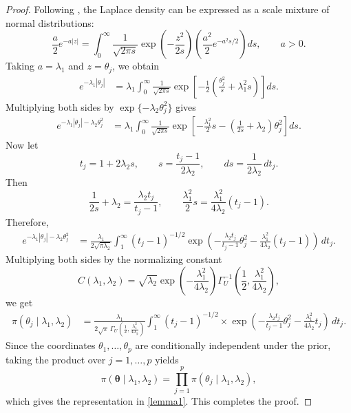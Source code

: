 \documentclass[preprint,12pt,authoryear]{elsarticle}
\def\th{\boldsymbol{\theta}}
\begin{document}
\begin{proof}
Following \cite{andrews1974scale}, the Laplace density can be expressed as a
scale mixture of normal distributions:
\begin{equation}\label{laplace_andrew}
\frac{a}{2}e^{-a|z|}
=
\int_0^\infty
\frac{1}{\sqrt{2\pi s}}
\exp\!\left(-\frac{z^2}{2s}\right)
\left(
\frac{a^2}{2}e^{-a^2s/2}
\right)ds,
\qquad a>0.
\end{equation}
Taking \(a=\lambda_1\) and \(z=\theta_j\), we obtain
\begin{align}
e^{-\lambda_1|\theta_j|}
&=
\lambda_1
\int_0^\infty
\frac{1}{\sqrt{2\pi s}}
\exp\!\left[
-\frac12
\left(
\frac{\theta_j^2}{s}
+
\lambda_1^2s
\right)
\right]ds .
\end{align}
Multiplying both sides by \(\exp\{-\lambda_2\theta_j^2\}\) gives
\begin{align}
e^{-\lambda_1|\theta_j|-\lambda_2\theta_j^2}
&=
\lambda_1
\int_0^\infty
\frac{1}{\sqrt{2\pi s}}
\exp\!\left[
-\frac{\lambda_1^2}{2}s
-
\left(
\frac{1}{2s}
+
\lambda_2
\right)\theta_j^2
\right]ds .
\end{align}
Now let
\[
t_j=1+2\lambda_2s,
\qquad
s=\frac{t_j-1}{2\lambda_2},
\qquad
ds=\frac{1}{2\lambda_2}\,dt_j .
\]
Then
\[
\frac{1}{2s}+\lambda_2
=
\frac{\lambda_2t_j}{t_j-1},
\qquad
\frac{\lambda_1^2}{2}s
=
\frac{\lambda_1^2}{4\lambda_2}(t_j-1).
\]
Therefore,
\begin{align}
e^{-\lambda_1|\theta_j|-\lambda_2\theta_j^2}
&=
\frac{\lambda_1}{2\sqrt{\pi\lambda_2}}
\int_1^\infty
(t_j-1)^{-1/2}
\exp\!\left(
-\frac{\lambda_2t_j}{t_j-1}\theta_j^2
-\frac{\lambda_1^2}{4\lambda_2}(t_j-1)
\right)\,dt_j .
\end{align}
Multiplying both sides by the normalizing constant
\[
C(\lambda_1,\lambda_2)
=
\sqrt{\lambda_2}
\exp\!\left(
-\frac{\lambda_1^2}{4\lambda_2}
\right)
\Gamma_U^{-1}
\left(
\frac12,
\frac{\lambda_1^2}{4\lambda_2}
\right),
\]
we get
\begin{align}
\pi(\theta_j\mid \lambda_1,\lambda_2)
&=
\frac{\lambda_1}
{2\sqrt{\pi}\,
\Gamma_U\left(\frac12,\frac{\lambda_1^2}{4\lambda_2}\right)}
\int_1^\infty
(t_j-1)^{-1/2} \times
\exp\!\left(
-\frac{\lambda_2t_j}{t_j-1}\theta_j^2
-\frac{\lambda_1^2}{4\lambda_2}t_j
\right)\,dt_j .
\end{align}
Since the coordinates \(\theta_1,\dots,\theta_p\) are conditionally independent
under the prior, taking the product over \(j=1,\dots,p\) yields
\[
\pi(\th\mid \lambda_1,\lambda_2)
=
\prod_{j=1}^p
\pi(\theta_j\mid \lambda_1,\lambda_2),
\]
which gives the representation in \eqref{lemma1}. This completes the proof.
\end{proof}
\end{document}

